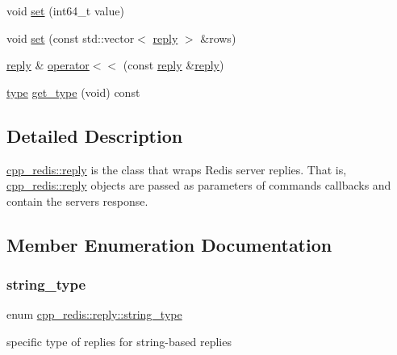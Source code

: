\begin{DoxyCompactItemize}
void \hyperlink{classcpp__redis_1_1reply_a2443bd6d4fb35279db198ba876e1ad34}{set} (int64\+\_\+t value)
\item 
void \hyperlink{classcpp__redis_1_1reply_ab64ee3720832e60ed47b91fd5b3045bd}{set} (const std\+::vector$<$ \hyperlink{classcpp__redis_1_1reply}{reply} $>$ \&rows)
\item 
\hyperlink{classcpp__redis_1_1reply}{reply} \& \hyperlink{classcpp__redis_1_1reply_a4f2a05711b5db6b53108cb9eec4e19be}{operator$<$$<$} (const \hyperlink{classcpp__redis_1_1reply}{reply} \&\hyperlink{classcpp__redis_1_1reply}{reply})
\item 
\hyperlink{classcpp__redis_1_1reply_acc272b2a52164cac1d110c619a0b25bd}{type} \hyperlink{classcpp__redis_1_1reply_ab196726881aea799186228d49a2283ba}{get\+\_\+type} (void) const
\end{DoxyCompactItemize}


\subsection{Detailed Description}
\hyperlink{classcpp__redis_1_1reply}{cpp\+\_\+redis\+::reply} is the class that wraps Redis server replies. That is, \hyperlink{classcpp__redis_1_1reply}{cpp\+\_\+redis\+::reply} objects are passed as parameters of commands callbacks and contain the server\textquotesingle{}s response. 

\subsection{Member Enumeration Documentation}
\mbox{\label{classcpp__redis_1_1reply_ac192ba4cb8f2bb6e7cb465edf755328b}} 
\subsubsection{\texorpdfstring{string\+\_\+type}{string\_type}}
{\footnotesize\ttfamily enum \hyperlink{classcpp__redis_1_1reply_ac192ba4cb8f2bb6e7cb465edf755328b}{cpp\+\_\+redis\+::reply\+::string\+\_\+type}\hspace{0.3cm}{\ttfamily [strong]}}

specific type of replies for string-\/based replies \mbox{\label{classcpp__redis_1_1reply_acc272b2a52164cac1d110c619a0b25bd}} 
